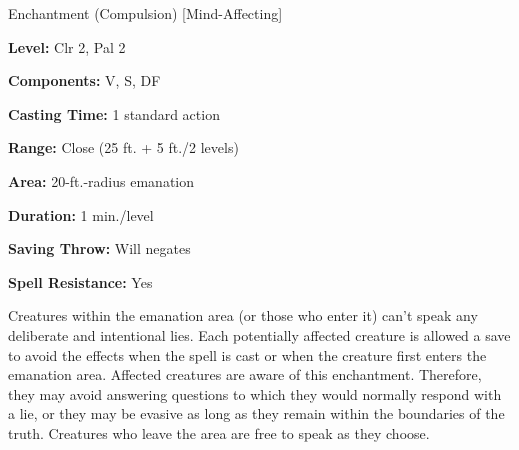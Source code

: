 
Enchantment (Compulsion) [Mind-Affecting]

\textbf{Level:} Clr 2, Pal 2

\textbf{Components:} V, S, DF

\textbf{Casting Time:} 1 standard action

\textbf{Range:} Close (25 ft. + 5 ft./2 levels)

\textbf{Area:} 20-ft.-radius emanation

\textbf{Duration:} 1 min./level

\textbf{Saving Throw:} Will negates

\textbf{Spell Resistance:} Yes

Creatures within the emanation area (or those who enter it) can't speak any deliberate 
and intentional lies. Each potentially affected creature is allowed a save to avoid 
the effects when the spell is cast or when the creature first enters the emanation 
area. Affected creatures are aware of this enchantment. Therefore, they may avoid 
answering questions to which they would normally respond with a lie, or they may 
be evasive as long as they remain within the boundaries of the truth. Creatures 
who leave the area are free to speak as they choose.

